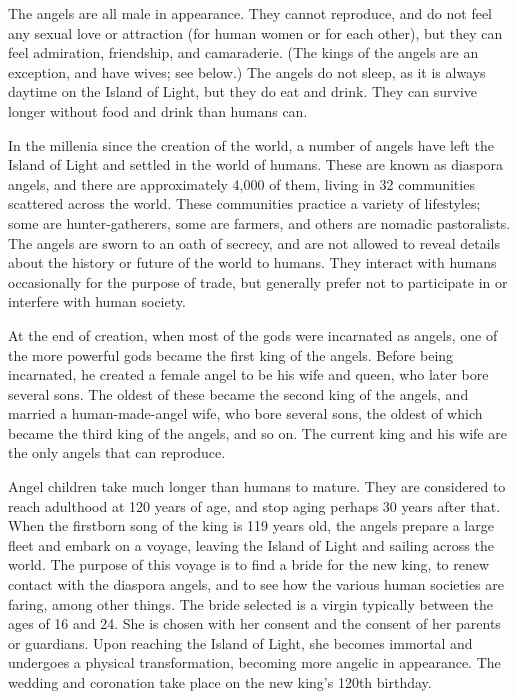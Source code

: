 \documentclass{article}
\begin{document}
The angels are all male in appearance. They cannot reproduce, and do not feel any sexual love or attraction (for human women or for each other), but they can feel admiration, friendship, and camaraderie. (The kings of the angels are an exception, and have wives; see below.) The angels do not sleep, as it is always daytime on the Island of Light, but they do eat and drink. They can survive longer without food and drink than humans can.

In the millenia since the creation of the world, a number of angels have left the Island of Light and settled in the world of humans. These are known as diaspora angels, and there are approximately 4,000 of them, living in 32 communities scattered across the world. These communities practice a variety of lifestyles; some are hunter-gatherers, some are farmers, and others are nomadic pastoralists. The angels are sworn to an oath of secrecy, and are not allowed to reveal details about the history or future of the world to humans. They interact with humans occasionally for the purpose of trade, but generally prefer not to participate in or interfere with human society.

At the end of creation, when most of the gods were incarnated as angels, one of the more powerful gods became the first king of the angels. Before being incarnated, he created a female angel to be his wife and queen, who later bore several sons. The oldest of these became the second king of the angels, and married a human-made-angel wife, who bore several sons, the oldest of which became the third king of the angels, and so on. The current king and his wife are the only angels that can reproduce.

Angel children take much longer than humans to mature. They are considered to reach adulthood at 120 years of age, and stop aging perhaps 30 years after that. When the firstborn song of the king is 119 years old, the angels prepare a large fleet and embark on a voyage, leaving the Island of Light and sailing across the world. The purpose of this voyage is to find a bride for the new king, to renew contact with the diaspora angels, and to see how the various human societies are faring, among other things. The bride selected is a virgin typically between the ages of 16 and 24. She is chosen with her consent and the consent of her parents or guardians. Upon reaching the Island of Light, she becomes immortal and undergoes a physical transformation, becoming more angelic in appearance. The wedding and coronation take place on the new king's 120th birthday.
\end{document}
